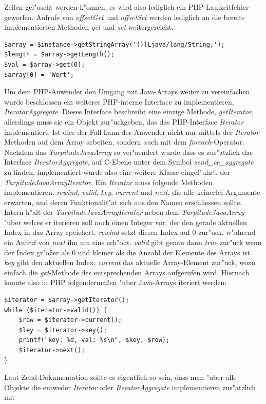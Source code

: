 Zeilen gel"oscht werden k"onnen, es wird also lediglich ein PHP-Laufzeitfehler geworfen. Aufrufe von \emph{offsetGet} und \emph{offsetSet} werden lediglich
an die bereits implementierten Methoden \emph{get} und \emph{set} weitergereicht. 
\begin{lstlisting}[caption=Zugriff auf ein Java-Array]
$array = $instance->getStringArray('()[Ljava/lang/String;');
$length = $array->getLength();
$val = $array->get(0);
$array[0] = 'Wert';
\end{lstlisting}
Um dem PHP-Anwender den Umgang mit Java-Arrays weiter zu vereinfachen wurde beschlossen ein weiteres PHP-interne Interface zu implementieren, \emph{IteratorAggregate}.
Dieses Interface beschreibt eine einzige Methode, \emph{getIterator}, allerdings muss sie ein Objekt zur"uckgeben, das das PHP-Interface \emph{Iterator} implementiert.
Ist dies der Fall kann der Anwender nicht nur mittels der \emph{Iterator}-Methoden auf dem Array arbeiten, sondern auch mit dem \emph{foreach}-Operator. Nachdem
das \emph{TurpitudeJavaArray} so ver"aendert wurde dass es zus"atzlich das Interface \emph{IteratorAggregate}, auf C-Ebene unter dem Symbol \emph{zend\_ce\_aggregate}
zu finden, implementiert wurde also eine weitere Klasse eingef"uhrt, der \emph{TurpitudeJavaArrayIterator}. Ein \emph{Iterator} muss folgende Methoden implementieren:
\emph{rewind}, \emph{valid}, \emph{key}, \emph{current} und \emph{next}, die alle keinerlei Argumente erwarten, und deren Funktionalit"at sich aus den Namen erschliessen 
sollte. Intern h"alt der \emph{TurpitudeJavaArrayIterator} neben dem \emph{TurpitudeJavaArray} "uber welces er iterieren soll noch einen Integer vor, der den
gerade aktuellen Index in das Array speichert. \emph{rewind} setzt diesen Index auf 0 zur"uck, w"ahrend ein Aufruf von \emph{next} ihn um eins erh"oht. \emph{valid} gibt
genau dann \emph{true} zur"uck wenn der Index gr"o\ss er als 0 und kleiner als die Anzahl der Elemente des Arrays ist. \emph{key} gibt den aktuellen Index, \emph{current}
das aktuelle Array-Element zur"uck, wozu einfach die \emph{get}-Methode des entsprechenden Arrays aufgerufen wird. Hiernach konnte also in PHP folgenderma\ss en "uber Java-Arrays
iteriert werden:
\begin{lstlisting}[caption=Iterieren "uber ein Java-Array]
$iterator = $array->getIterator();
while ($iterator->valid()) {
    $row = $iterator->current();
    $ley = $iterator->key();
    printf("key: %d, val: %s\n", $key, $row);
    $iterator->next();
}
\end{lstlisting}
Laut Zend-Dokumentation sollte es eigentlich so sein, dass man "uber alle Objekte die entweder \emph{Iterator} oder \emph{IteratorAggregate} implementieren zus"atzlich mit
